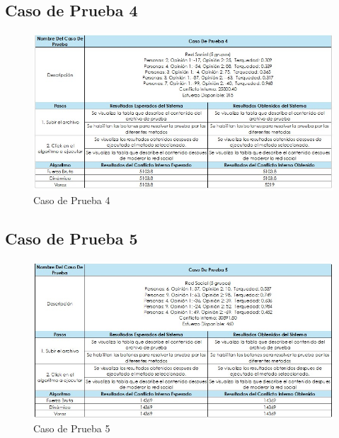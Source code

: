 \documentclass[11pt,letter]{article}
\begin{document}
\subsection{Caso de Prueba 4}
\begin{figure}[H]
    \centering
    \includegraphics[width=\linewidth]{resources/cp4.jpeg}
    \caption{Caso de Prueba 4}
    \label{fig:cp4}
\end{figure}

\subsection{Caso de Prueba 5}
\begin{figure}[H]
    \centering
    \includegraphics[width=\linewidth]{resources/cp5.jpeg}
    \caption{Caso de Prueba 5}
    \label{fig:cp5}
\end{figure}



\newpage
\nocite{*}
\printbibliography
\end{document}
